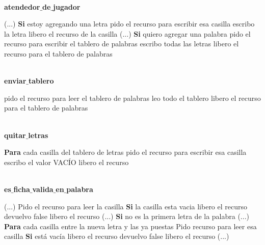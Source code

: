 \mbox{}\\
\textbf{atendedor$\_$de$\_$jugador}
\begin{codebox}
\li (...)
\li \textbf{Si} estoy agregando una letra\Do
\li	pido el recurso para escribir esa casilla
\li	escribo la letra
\li	libero el recurso de la casilla \End
\li (...)
\li \textbf{Si} quiero agregar una palabra\Do
\li	pido el recurso para escribir el tablero de palabras
\li	escribo todas las letras
\li	libero el recurso para el tablero de palabras \End
\end{codebox}

\mbox{}\\
\textbf{enviar$\_$tablero}
\begin{codebox}
\li pido el recurso para leer el tablero de palabras
\li leo todo el tablero
\li libero el recurso para el tablero de palabras
\end{codebox}

\mbox{}\\
\textbf{quitar$\_$letras} 
\begin{codebox}
\li \textbf{Para} cada casilla del tablero de letras \Do
\li	pido el recurso para escribir esa casilla
\li	escribo el valor VACÍO
\li	libero el recurso \End
\end{codebox}
\mbox{}\\
\textbf{es$\_$ficha$\_$valida$\_$en$\_$palabra}
\begin{codebox}
\li (...)
\li Pido el recurso para leer la casilla
\li \textbf{Si} la casilla esta vacia\Do
\li	libero el recurso
\li	devuelvo false\End
\li libero el recurso
\li (...)
\li \textbf{Si} no es la primera letra de la palabra \Do
\li	(...)
\li	\textbf{Para} cada casilla entre la nueva letra y las ya puestas \Do
\li		Pido recurso para leer esa casilla
\li		\textbf{Si} está vacía \Do
\li			libero el recurso
\li			devuelvo false \End
\li		libero el recurso \End \End
\li						
\li (...)
\end{codebox}

